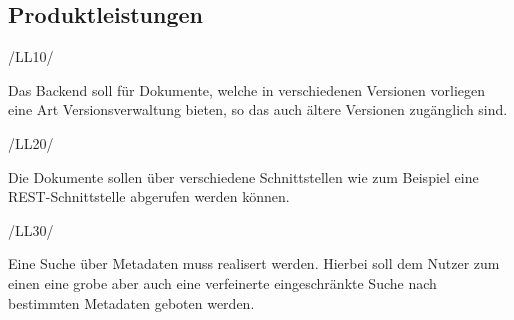 \subsection{Produktleistungen} \label{Produktleistungen}
\begin{minipage}{3cm}
/LL10/
\end{minipage}
\begin{minipage}{13cm}
Das Backend soll f\"ur Dokumente, welche in verschiedenen Versionen vorliegen eine Art Versionsverwaltung bieten, so das auch \"altere Versionen zug\"anglich sind.\\
\end{minipage}
\begin{minipage}{3cm}
/LL20/
\end{minipage}
\begin{minipage}{13cm}
Die Dokumente sollen \"uber verschiedene Schnittstellen wie zum Beispiel eine \ac{REST}-Schnittstelle abgerufen werden k\"onnen. \cite{Wiki_REST}\\
\end{minipage}
\begin{minipage}{3cm}
/LL30/
\end{minipage}
\begin{minipage}{13cm}
Eine Suche \"uber Metadaten muss realisert werden. Hierbei soll dem Nutzer zum einen eine grobe aber auch eine verfeinerte eingeschr\"ankte Suche nach bestimmten Metadaten geboten werden.\\
\end{minipage}